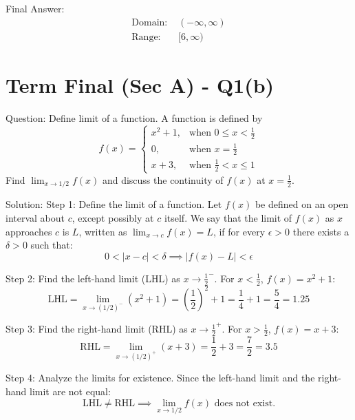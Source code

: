 \documentclass{article}
\begin{document}
Final Answer:
\[
\boxed{
\begin{aligned}
\text{Domain: } & (-\infty, \infty) \\
\text{Range: } & [6, \infty)
\end{aligned}
}
\]

\section*{Term Final (Sec A) - Q1(b)}
Question:
Define limit of a function. A function is defined by 
\[
f(x) = \begin{cases} 
x^2+1, & \text{when } 0 \le x < \frac{1}{2} \\ 
0, & \text{when } x = \frac{1}{2} \\ 
x+3, & \text{when } \frac{1}{2} < x \le 1 
\end{cases}
\]
Find $\lim_{x \to 1/2} f(x)$ and discuss the continuity of $f(x)$ at $x = \frac{1}{2}$.

Solution:
Step 1: Define the limit of a function.
Let $f(x)$ be defined on an open interval about $c$, except possibly at $c$ itself. We say that the limit of $f(x)$ as $x$ approaches $c$ is $L$, written as $\lim_{x \to c} f(x) = L$, if for every $\epsilon > 0$ there exists a $\delta > 0$ such that:
\[
0 < |x - c| < \delta \implies |f(x) - L| < \epsilon
\]

Step 2: Find the left-hand limit (LHL) as $x \to \frac{1}{2}^-$.
For $x < \frac{1}{2}$, $f(x) = x^2 + 1$:
\[
\text{LHL} = \lim_{x \to (1/2)^-} (x^2 + 1) = \left(\frac{1}{2}\right)^2 + 1 = \frac{1}{4} + 1 = \frac{5}{4} = 1.25
\]

Step 3: Find the right-hand limit (RHL) as $x \to \frac{1}{2}^+$.
For $x > \frac{1}{2}$, $f(x) = x + 3$:
\[
\text{RHL} = \lim_{x \to (1/2)^+} (x + 3) = \frac{1}{2} + 3 = \frac{7}{2} = 3.5
\]

Step 4: Analyze the limits for existence.
Since the left-hand limit and the right-hand limit are not equal:
\[
\text{LHL} \ne \text{RHL} \implies \lim_{x \to 1/2} f(x) \text{ does not exist.}
\]
\end{document}
